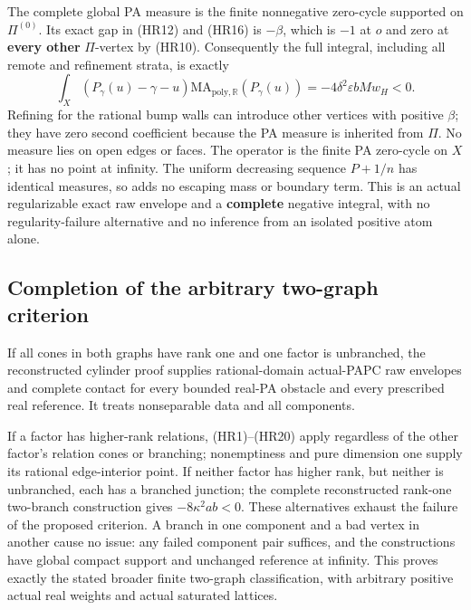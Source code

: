 \documentclass[
  11pt,
]{article}
\begin{document}
The complete global PA measure is the finite nonnegative zero-cycle
supported on \(\Pi^{(0)}\). Its exact gap in (HR12) and (HR16) is
\(-\beta\), which is \(-1\) at \(o\) and zero at \textbf{every other}
\(\Pi\)-vertex by (HR10). Consequently the full integral, including all
remote and refinement strata, is exactly \[
 \int_X(P_\gamma(u)-\gamma-u)
              \mathrm{MA}_{\mathrm{poly},\mathbb R}(P_\gamma(u))
                  =-4\delta^2\varepsilon bMw_H<0.           \tag{HR20}
\] Refining for the rational bump walls can introduce other vertices
with positive \(\beta\); they have zero second coefficient because the
PA measure is inherited from \(\Pi\). No measure lies on open edges or
faces. The operator is the finite PA zero-cycle on \(X\); it has no
point at infinity. The uniform decreasing sequence \(P+1/n\) has
identical measures, so adds no escaping mass or boundary term. This is
an actual regularizable exact raw envelope and a \textbf{complete}
negative integral, with no regularity-failure alternative and no
inference from an isolated positive atom alone.

\subsection{Completion of the arbitrary two-graph
criterion}\label{completion-of-the-arbitrary-two-graph-criterion}

If all cones in both graphs have rank one and one factor is unbranched,
the reconstructed cylinder proof supplies rational-domain actual-PAPC
raw envelopes and complete contact for every bounded real-PA obstacle
and every prescribed real reference. It treats nonseparable data and all
components.

If a factor has higher-rank relations, (HR1)--(HR20) apply regardless of
the other factor's relation cones or branching; nonemptiness and pure
dimension one supply its rational edge-interior point. If neither factor
has higher rank, but neither is unbranched, each has a branched
junction; the complete reconstructed rank-one two-branch construction
gives \(-8\kappa^2ab<0\). These alternatives exhaust the failure of the
proposed criterion. A branch in one component and a bad vertex in
another cause no issue: any failed component pair suffices, and the
constructions have global compact support and unchanged reference at
infinity. This proves exactly the stated broader finite two-graph
classification, with arbitrary positive actual real weights and actual
saturated lattices.
\end{document}
